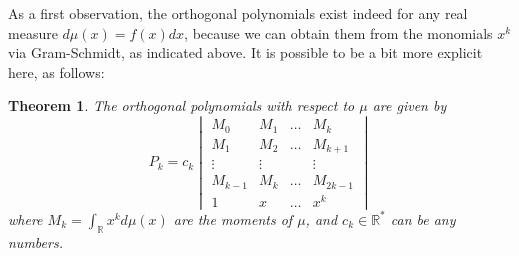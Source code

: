 \documentclass[12pt]{amsbook}
\newtheorem{theorem}{Theorem}[chapter]
\begin{document}
As a first observation, the orthogonal polynomials exist indeed for any real measure $d\mu(x)=f(x)dx$, because we can obtain them from the monomials $x^k$ via Gram-Schmidt, as indicated above. It is possible to be a bit more explicit here, as follows:

\begin{theorem}
The orthogonal polynomials with respect to $\mu$ are given by
$$P_k=c_k\begin{vmatrix}
M_0&M_1&\ldots&M_k\\
M_1&M_2&\ldots&M_{k+1}\\
\vdots&\vdots&&\vdots\\
M_{k-1}&M_k&\ldots&M_{2k-1}\\
1&x&\ldots&x^k
\end{vmatrix}$$
where $M_k=\int_\mathbb Rx^kd\mu(x)$ are the moments of $\mu$, and $c_k\in\mathbb R^*$ can be any numbers.
\end{theorem}
\end{document}
